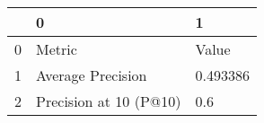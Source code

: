 \begin{tabular}{lll}
\toprule
{} &                       0 &         1 \\
\midrule
0 &                  Metric &     Value \\
1 &       Average Precision &  0.493386 \\
2 &  Precision at 10 (P@10) &       0.6 \\
\bottomrule
\end{tabular}
